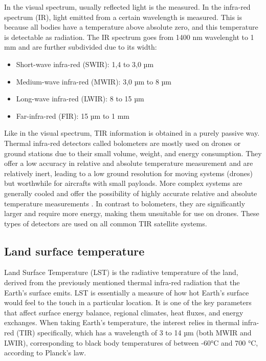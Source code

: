     In the visual spectrum, usually reflected light is the measured. 
    In the infra-red spectrum (IR), light emitted from a certain wavelength is measured.
    This is because all bodies have a temperature above absolute zero, and this temperature is detectable as radiation.
    The IR spectrum goes from 1400 nm wavelenght to 1 mm and are further subdivided due to its width:

    \begin{itemize}
        \item  Short-wave infra-red (SWIR): 1,4 to 3,0 µm
        \item  Medium-wave infra-red (MWIR): 3,0 µm to 8 µm
        \item Long-wave infra-red (LWIR): 8 to 15 µm
        \item Far-infra-red (FIR): 15 µm to 1 mm
    \end{itemize}
    
    Like in the visual spectrum, TIR information is obtained in a purely passive way.
    Thermal infra-red detectors called bolometers are mostly used on drones or ground stations due to their small volume, weight, and energy consumption. 
    They offer a low accuracy in relative and absolute temperature measurement and are relatively inert, leading to a low ground resolution for moving systems (drones) but worthwhile for aircrafts with small payloads.     
    More complex systems are generally cooled and offer the possibility of highly accurate relative and absolute temperature measurements .
    In contrast to bolometers, they are significantly larger and require more energy, making them unsuitable for use on drones.
    These types of detectors are used on all common TIR satellite systems.

    \subsection{Land surface temperature}

        Land Surface Temperature (LST) is the radiative temperature of the land, derived from the previously mentioned thermal infra-red radiation that the Earth’s surface emits.
        LST is essentially a measure of how hot Earth's surface would feel to the touch in a particular location.
        It is one of the key parameters that affect surface energy balance, regional climates, heat fluxes, and energy exchanges.
        When taking Earth’s temperature, the interest relies in thermal infra-red (TIR) specifically, which has a wavelength of 3 to 14 µm (both MWIR and LWIR), corresponding to black body temperatures of between -60°C and 700 °C, according to Planck’s law.

